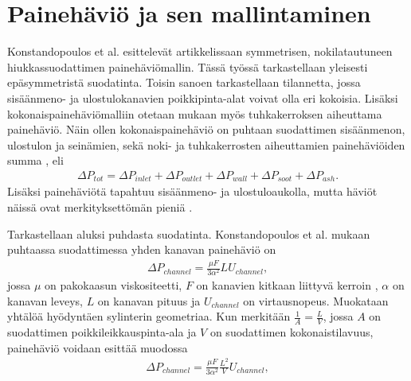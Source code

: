 \section{Painehäviö ja sen mallintaminen}
%     

Konstandopoulos et al. esittelevät artikkelissaan \cite{Konstandopoulos2000} symmetrisen, nokilatautuneen hiukkassuodattimen painehäviömallin. Tässä työssä tarkastellaan yleisesti epäsymmetristä suodatinta. Toisin sanoen tarkastellaan tilannetta, jossa sisäänmeno- ja ulostulokanavien poikkipinta-alat voivat olla eri kokoisia. Lisäksi kokonaispainehäviömalliin otetaan mukaan myös tuhkakerroksen aiheuttama painehäviö. Näin ollen kokonaispainehäviö on puhtaan suodattimen sisäänmenon, ulostulon ja seinämien, sekä noki- ja tuhkakerrosten aiheuttamien painehäviöiden summa \cite{Konstandopoulos2000}\cite{Konstandopoulos2008}, eli
\begin{align}
    \Delta P_{tot} = \Delta P_{inlet} +  \Delta P_{outlet} + \Delta P_{wall} + \Delta P_{soot} +  \Delta P_{ash}.
\end{align}
Lisäksi painehäviötä tapahtuu sisäänmeno- ja ulostuloaukolla, mutta häviöt näissä ovat merkityksettömän pieniä \cite{Konstandopoulos2000}.

Tarkastellaan aluksi puhdasta suodatinta.
Konstandopoulos et al. mukaan puhtaassa suodattimessa yhden kanavan painehäviö on
\begin{align}
    \Delta P_{channel} = \frac{\mu F}{3 \alpha^2} LU_{channel},
\end{align}
jossa \(\mu \) on pakokaasun viskositeetti, \(F\) on kanavien kitkaan liittyvä kerroin \cite{dieselnet_wall_flow_monolith}, \(\alpha\) on kanavan leveys, \(L\) on kanavan pituus ja \(U_{channel}\) on virtausnopeus.
Muokataan yhtälöä hyödyntäen sylinterin geometriaa. Kun merkitään \(\frac{1}{A} = \frac{L}{V}\), jossa \(A\) on suodattimen poikkileikkauspinta-ala ja \(V\) on suodattimen kokonaistilavuus, painehäviö voidaan esittää muodossa
\begin{align}\label{eq:clean_channel_pd}
    \Delta P_{channel} = \frac{\mu F}{3 \alpha^2} \frac{L^2}{V}U_{channel},
\end{align}

